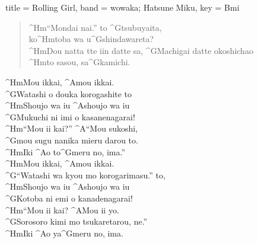 \begin{song}[
	remember-chords = false ,
	verse/numbered = true ,
	transpose-capo = true 
	]{
		title = Rolling Girl,
		band = wowaka; Hatsune Miku,
		key  = Bmi
	}
\begin{verse}
		^{Hm}“Mondai nai.” to ^{G}tsubuyaita, \\ 
		ko^{Hm}toba wa u^{G}shindawareta? \\
		^{Hm}Dou natta tte iin datte sa, ^{G}Machigai datte okoshichao \\
		^{Hm}to sasou, sa^{G}kamichi. \\
		
	\end{verse}
	\begin{chorus}
		
		^{Hm}Mou ikkai, ^{A}mou ikkai.\\
		^{G}Watashi o douka korogashite to\\
		^{Hm}Shoujo wa iu ^{A}shoujo wa iu\\
		^{G}Mukuchi ni imi o kasanenagarai!\\
		
		^{Hm}“Mou ii kai?” ^{A}“Mou sukoshi, \\
		^{G}mou sugu nanika mieru darou to. \\
		^{Hm}Iki ^{A}o to^{G}meru no, ima.”\\
		
		^{Hm}Mou ikkai, ^{A}mou ikkai. \\
		^{G}“Watashi wa kyou mo korogarimasu.” to, \\
		^{Hm}Shoujo wa iu ^{A}shoujo wa iu \\
		^{G}Kotoba ni emi o kanadenagarai! \\
		
		^{Hm}“Mou ii kai? ^{A}Mou ii yo. \\
		^{G}Sorosoro kimi mo tsukaretarou, ne.” \\
		^{Hm}Iki ^{A}o ya^{G}meru no, ima. \\
		
		
	\end{chorus}
\end{song}